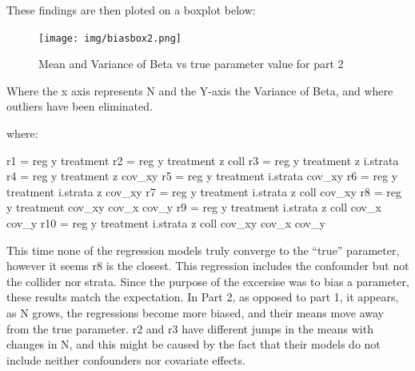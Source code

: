 \documentclass[
]{article}
\begin{document}
These findings are then ploted on a boxplot below:

\begin{figure}
\centering
\texttt{[image: img/biasbox2.png]}
\caption{Mean and Variance of Beta vs true parameter value for part 2}
\end{figure}

Where the x axis represents N and the Y-axis the Variance of Beta, and
where outliers have been eliminated.

where:

r1 = reg y treatment r2 = reg y treatment z coll r3 = reg y treatment z
i.strata r4 = reg y treatment z cov\_xy r5 = reg y treatment i.strata
cov\_xy r6 = reg y treatment i.strata z cov\_xy r7 = reg y treatment
i.strata z coll cov\_xy r8 = reg y treatment cov\_xy cov\_x cov\_y r9 =
reg y treatment i.strata z coll cov\_x cov\_y r10 = reg y treatment
i.strata z coll cov\_xy cov\_x cov\_y

This time none of the regression models truly converge to the ``true''
parameter, however it seems r8 is the closest. This regression includes
the confounder but not the collider nor strata. Since the purpose of the
excersise was to bias a parameter, these results match the expectation.
In Part 2, as opposed to part 1, it appears, as N grows, the regressions
become more biased, and their means move away from the true parameter.
r2 and r3 have different jumps in the means with changes in N, and this
might be caused by the fact that their models do not include neither
confounders nor covariate effects.
\end{document}
